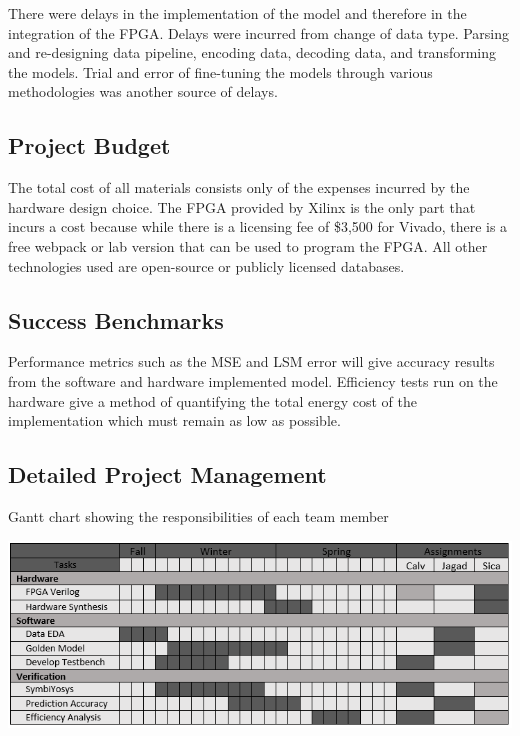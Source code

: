 \documentclass[12pt,titlepage]{article}
\begin{document}
There were delays in the implementation of the model and therefore in the integration of the FPGA. Delays were incurred from change of data
type. Parsing and re-designing data pipeline, encoding data, decoding data, and transforming the models. Trial and error of fine-tuning
the models through various methodologies was another source of delays.

\subsection{Project Budget}
The total cost of all materials consists only of the expenses incurred by the hardware design choice. The FPGA provided by Xilinx is the only part that
incurs a cost because while there is a licensing fee of \$3,500 for Vivado, there is a free webpack or lab version that can be used to program the FPGA.
All other technologies used are open-source or publicly licensed databases.

\subsection{Success Benchmarks}
Performance metrics such as the MSE and LSM error will give accuracy results from the software and hardware implemented model. Efficiency tests run on the
hardware give a method of quantifying the total energy cost of the implementation which must remain as low as possible. 

\newpage



\newpage
\begin{appendices}
\section{Detailed Project Management}
\begin{table}[!htb]
	\caption{Gantt chart showing the responsibilities of each team member}
	\label{tbl:gantt}
	\includegraphics[width=\linewidth]{gantt.png}
\end{table}
\end{appendices}
\end{document}
